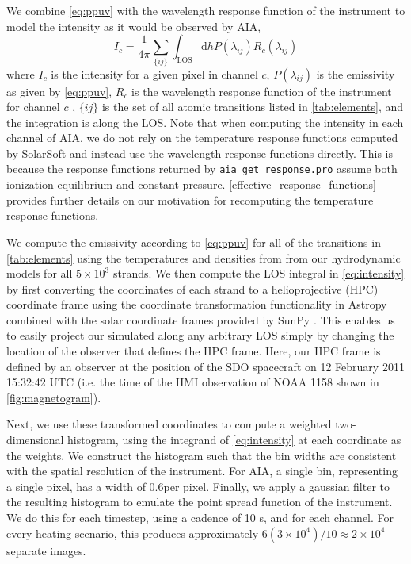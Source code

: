We combine \autoref{eq:ppuv} with the wavelength response function of the instrument to model the intensity as it would be observed by AIA,
\begin{equation}\label{eq:intensity}
    I_c = \frac{1}{4\pi}\sum_{\{ij\}}\int_{\text{LOS}}\mathrm{d}hP(\lambda_{ij})R_c(\lambda_{ij})
\end{equation}
where $I_c$ is the intensity for a given pixel in channel $c$, $P(\lambda_{ij})$ is the emissivity as given by \autoref{eq:ppuv}, $R_c$ is the wavelength response function of the instrument for channel $c$ \citep[see][]{boerner_initial_2012}, $\{ij\}$ is the set of all atomic transitions listed in \autoref{tab:elements}, and the integration is along the LOS. Note that when computing the intensity in each channel of AIA, we do not rely on the temperature response functions computed by SolarSoft \citep[SSW,][]{freeland_data_1998} and instead use the wavelength response functions directly. This is because the response functions returned by \texttt{aia\_get\_response.pro} assume both ionization equilibrium and constant pressure. \autoref{effective_response_functions} provides further details on our motivation for recomputing the temperature response functions.

We compute the emissivity according to \autoref{eq:ppuv} for all of the transitions in \autoref{tab:elements} using the temperatures and densities from from our hydrodynamic models for all $5\times10^3$ strands. We then compute the LOS integral in \autoref{eq:intensity} by first converting the coordinates of each strand to a helioprojective (HPC) coordinate frame \citep[see][]{thompson_coordinate_2006} using the coordinate transformation functionality in Astropy \citep{the_astropy_collaboration_astropy_2018} combined with the solar coordinate frames provided by SunPy \citep{sunpy_community_sunpypython_2015}. This enables us to easily project our simulated \AR{} along any arbitrary LOS simply by changing the location of the observer that defines the HPC frame. Here, our HPC frame is defined by an observer at the position of the SDO spacecraft on 12 February 2011 15:32:42 UTC (i.e. the time of the HMI observation of NOAA 1158 shown in \autoref{fig:magnetogram}).

Next, we use these transformed coordinates to compute a weighted two-dimensional histogram, using the integrand of \autoref{eq:intensity} at each coordinate as the weights. We construct the histogram such that the bin widths are consistent with the spatial resolution of the instrument. For AIA, a single bin, representing a single pixel, has a width of 0.6\arcsec per pixel. Finally, we  apply a gaussian filter to the resulting histogram to emulate the point spread function of the instrument. We do this for each timestep, using a cadence of 10 s, and for each channel. For every heating scenario, this produces approximately $6(3\times10^4)/10\approx2\times10^4$ separate images.

